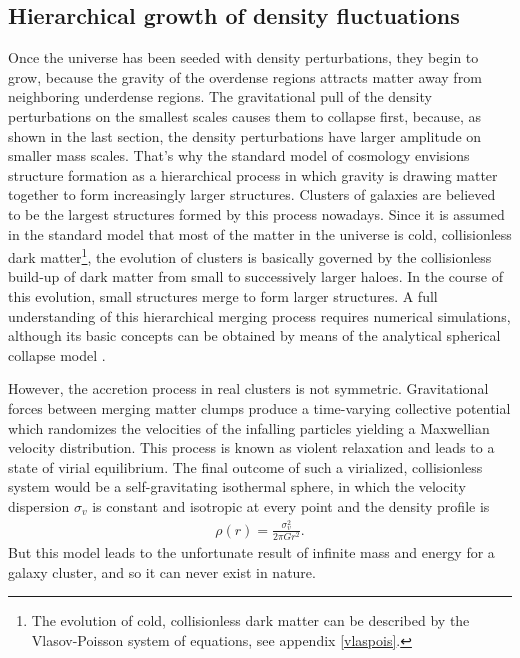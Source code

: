 \subsection{Hierarchical growth of density fluctuations}
Once the universe has been seeded with density perturbations, they begin to
grow, because the gravity of the overdense regions attracts matter
away from neighboring underdense regions. The gravitational pull of the density
perturbations on the smallest scales causes them to collapse first,
because, as shown in the last section, the density perturbations have larger
amplitude on smaller mass scales. That's why the standard model of cosmology
envisions structure formation as a hierarchical process in which gravity is
drawing matter together to form increasingly larger structures.
Clusters of galaxies are believed to be the largest structures formed by this
process nowadays. Since it is assumed in the standard model that most
of the matter in the universe is cold, collisionless dark matter\footnote{The
evolution of cold, collisionless dark matter can be described by the
Vlasov-Poisson system of equations, see appendix \ref{vlaspois}.}, the evolution
of clusters is basically governed by the collisionless build-up of dark
matter from small to successively larger haloes. In the
course of this
evolution, small structures merge to form larger structures. A full
understanding of this hierarchical merging process requires
numerical simulations, although its basic concepts can be obtained by means of
the analytical spherical collapse model \citep{Gunn1972,Bertschinger1985}.

However, the accretion process in real clusters is not symmetric. Gravitational
forces between merging matter clumps produce a time-varying collective
potential which randomizes the velocities of the infalling particles yielding
a Maxwellian velocity distribution. This process is known as violent relaxation
\citep{Lynden-Bell1967} and leads to a state of virial equilibrium.
The final outcome of such a virialized, collisionless system would be a
self-gravitating isothermal sphere, in which the velocity dispersion $\sigma_v$
is constant and isotropic at every point and the density profile is
\begin{align}
\rho(r)= \frac{\sigma_v^2}{2 \pi G r^2}.
\end{align}
But this model leads to the unfortunate result of infinite mass and energy
for a galaxy cluster, and so it can never exist in nature.

